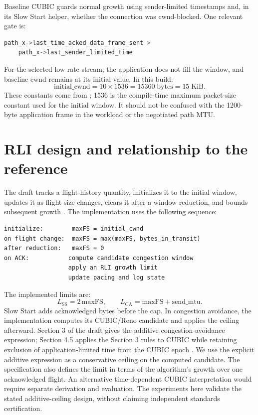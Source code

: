 \documentclass[11pt,a4paper]{article}
\newcommand{\code}[1]{\texttt{\detokenize{#1}}}
\begin{document}
Baseline CUBIC guards normal growth using sender-limited timestamps and,
in its Slow Start helper, whether the connection was cwnd-blocked. One
relevant gate is:
\begin{lstlisting}[language=C]
path_x->last_time_acked_data_frame_sent >
    path_x->last_sender_limited_time
\end{lstlisting}
For the selected low-rate stream, the application does not fill the
window, and baseline cwnd remains at its initial value. In this build:
\[
  \mathrm{initial\_cwnd} = 10\times 1536 = 15360\;\mathrm{bytes}
  = 15\;\mathrm{KiB}.
\]
These constants come from ; 1536 is the
compile-time maximum packet-size constant used for the initial window.
It should not be confused with the 1200-byte application frame in the
workload or the negotiated path MTU.

\section{RLI design and relationship to the reference}
The draft tracks a flight-history quantity, initializes it to the initial
window, updates it as flight size changes, clears it after a window
reduction, and bounds subsequent growth \cite{rli}. The implementation
uses the following sequence:
\begin{lstlisting}
initialize:        maxFS = initial_cwnd
on flight change:  maxFS = max(maxFS, bytes_in_transit)
after reduction:   maxFS = 0
on ACK:           compute candidate congestion window
                  apply an RLI growth limit
                  update pacing and log state
\end{lstlisting}

The implemented limits are:
\[
 L_{\mathrm{SS}} = 2\,\mathrm{maxFS},\qquad
 L_{\mathrm{CA}} = \mathrm{maxFS} + \mathrm{send\_mtu}.
\]
Slow Start adds acknowledged bytes before the cap. In congestion avoidance,
the implementation computes its CUBIC/Reno candidate and applies the
\code{maxFS + send_mtu} ceiling afterward. Section 3 of the draft gives
the additive congestion-avoidance expression; Section 4.5 applies the
Section 3 rules to CUBIC while retaining exclusion of application-limited
time from the CUBIC epoch \cite{rli}. We use the explicit additive expression
as a conservative ceiling on the computed candidate. The specification
also defines the limit in terms of the algorithm's growth over one
acknowledged flight. An alternative time-dependent CUBIC interpretation
would require separate derivation and evaluation. The experiments here
validate the stated additive-ceiling design, without claiming independent
standards certification.
\end{document}
